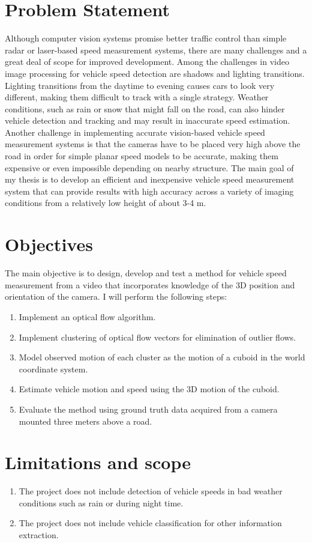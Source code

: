 \documentclass[a4paper]{aitthesis}
\begin{document}
\section{Problem Statement}
Although computer vision systems promise better traffic control than simple radar or laser-based speed measurement systems, there are many challenges and a great deal of scope for improved development. Among the challenges in video image processing for vehicle speed detection are shadows and lighting transitions. Lighting transitions from the daytime to evening causes cars to look very different, making them difficult to track with a single strategy. Weather conditions, such as rain or snow that might fall on the road, can also hinder vehicle detection and tracking and may result in inaccurate speed estimation. Another challenge in implementing accurate vision-based vehicle speed measurement systems is that the cameras have to be placed very high above the road in order for simple planar speed models to be accurate, making them expensive or even impossible depending on nearby structure. The main goal of my thesis is to develop an efficient and inexpensive vehicle speed measurement system that can provide results with high accuracy across a variety of imaging conditions from a relatively low height of about 3-4 m.

\section{Objectives}
The main objective is to design, develop and test a method for vehicle speed measurement from a video that incorporates knowledge of the 3D position and orientation of the camera. I will perform the following steps:
\begin{enumerate}
	\item Implement an optical flow algorithm.
	\item Implement clustering of optical flow vectors for elimination of outlier flows. 
	\item Model observed motion of each cluster as the motion of a cuboid in the world coordinate system.
	\item Estimate vehicle motion and speed using the 3D motion of the cuboid.
	\item Evaluate the method using ground truth data acquired from a camera mounted three meters above a road.
\end{enumerate}
\section{Limitations and scope}
\begin{enumerate}
	\item The project does not include detection of vehicle speeds in bad weather conditions such as rain or during night time. 
	\item The project does not include vehicle classification for other information extraction.
\end{enumerate}
\FloatBarrier
\end{document}
